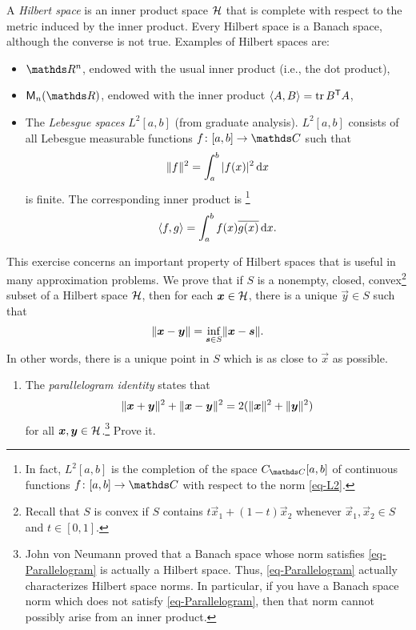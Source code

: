 \documentclass{../homework}
\begin{document}
\begin{Exercise}
	A \emph{Hilbert space} is an inner product space \(\mathcal H\) that is
  complete with respect to the metric induced by the inner product.
  Every Hilbert space is a Banach space, although the converse is not
  true.  Examples of Hilbert spaces are:
	\begin{itemize}
  \item \(\R^n\), endowed with the usual inner product (i.e., the dot
    product),
  \item \(\M_n(\R)\), endowed with the inner product
    \(\langle {A,B} \rangle = \operatorname*{tr}{B^{\mathsf{T}} A}\),
  \item The \emph{Lebesgue spaces} \(L^2[a,b]\) (from graduate
    analysis).  \(L^2[a,b]\) consists of all Lebesgue measurable
    functions \(f \colon [a,b]\to\C\) such that
    \begin{equation}\label{eq-L2}
      \lVert {f} \rVert^2 = \int_a^b |f(x)|^2 \mathop{}\! \mathrm d x
    \end{equation}
    is finite.  The corresponding inner product is \footnote{In fact,
      \(L^2[a,b]\) is the completion of the space \(C_{\C}[a,b]\) of
      continuous functions \(f\colon[a,b]\to\C\) with respect to the
      norm \eqref{eq-L2}.}
    \begin{equation*}
      \langle {f,g} \rangle = \int_a^b f(x)\overline{g(x)} \mathop{}\! \mathrm d x.
    \end{equation*}
	\end{itemize}
	This exercise concerns an important property of Hilbert spaces that
  is useful in many approximation problems.  We prove that if \(S\) is
  a nonempty, closed, convex\footnote{Recall that \(S\) is convex if
    \(S\) contains \(t \vec{x}_1 + (1-t) \vec{x}_2\) whenever
    \(\vec{x}_1, \vec{x}_2 \in S\) and \(t\in [0,1]\).}  subset of a
  Hilbert space \(\mathcal H\), then for each \(\vec{x} \in \h\), there is a
  unique \(\vec{y} \in S\) such that
	\begin{equation}
    \label{eq-MinimumAttained}
		\norm{ \vec{x} - \vec{y} }
    = \inf_{ \vec{s} \in S } \norm{ \vec{x} - \vec{s} }.
	\end{equation}
	In other words, there is a unique point in \(S\) which is as close to
  \(\vec{x}\) as possible.
	\begin{enumerate}
  \item The \emph{parallelogram identity} states that
    \begin{equation}\label{eq-Parallelogram}
      \norm{ \vec{x} + \vec{y} }^2 + \norm{ \vec{x} - \vec{y}}^2
      = 2( \norm{ \vec{x} }^2 + \norm{ \vec{y} }^2)
    \end{equation}
    for all \(\vec{x}, \vec{y} \in \h\).\footnote{John von Neumann
      proved that a Banach space whose norm satisfies
      \eqref{eq-Parallelogram} is actually a Hilbert space.  Thus,
      \eqref{eq-Parallelogram} actually characterizes Hilbert space
      norms.  In particular, if you have a Banach space norm which
      does not satisfy \eqref{eq-Parallelogram}, then that norm cannot
      possibly arise from an inner product.}  Prove it.


\end{enumerate}
\end{Exercise}
\end{document}
